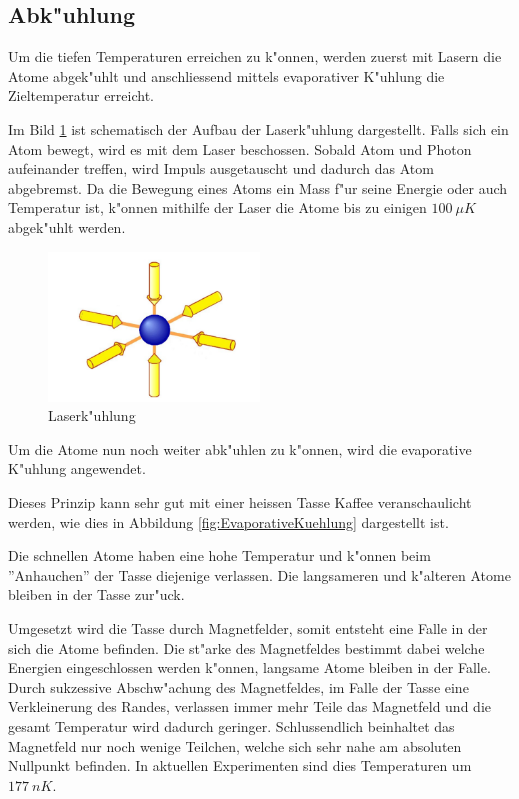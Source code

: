 \begin{refsection}
\subsection{Abk"uhlung}

Um die tiefen Temperaturen erreichen zu k"onnen, werden zuerst mit Lasern die Atome abgek"uhlt und anschliessend mittels evaporativer K"uhlung die Zieltemperatur erreicht. 

Im Bild \ref{fig:LaserKuehlung} ist schematisch der Aufbau der Laserk"uhlung dargestellt.
Falls sich ein Atom bewegt, wird es mit dem Laser beschossen. Sobald Atom und Photon aufeinander treffen, wird Impuls ausgetauscht und dadurch das Atom abgebremst.
Da die Bewegung eines Atoms ein Mass f"ur seine Energie oder auch Temperatur ist, k"onnen mithilfe der Laser die Atome bis zu einigen $100~\mu K$  abgek"uhlt werden. \cite{bose:LaserKuehlung}

\begin{figure}
	\centering
	\includegraphics[width = 0.5\textwidth]{./bose/laserkuehlung.png} 
	\caption[Laserk"uhlung]{Laserk"uhlung \cite{bose:WikiLaserKuehl}}
	\label{fig:LaserKuehlung}
\end{figure}

Um die Atome nun noch weiter abk"uhlen zu k"onnen, wird die evaporative K"uhlung angewendet.

Dieses Prinzip kann sehr gut mit einer heissen Tasse Kaffee veranschaulicht werden, wie dies in Abbildung \ref{fig:EvaporativeKuehlung} dargestellt ist.

Die schnellen Atome haben eine hohe Temperatur und k"onnen beim ''Anhauchen'' der Tasse diejenige verlassen. Die langsameren und k"alteren Atome bleiben in der Tasse zur"uck.

Umgesetzt wird die Tasse durch Magnetfelder, somit entsteht eine Falle in der sich die Atome befinden. Die st"arke des Magnetfeldes bestimmt dabei welche Energien eingeschlossen werden k"onnen, langsame Atome bleiben in der Falle. Durch sukzessive Abschw"achung des Magnetfeldes, im Falle der Tasse eine Verkleinerung des Randes, verlassen immer mehr Teile das Magnetfeld und die gesamt Temperatur wird dadurch geringer. Schlussendlich beinhaltet das Magnetfeld nur noch wenige Teilchen, welche sich sehr nahe am absoluten Nullpunkt befinden. In aktuellen Experimenten sind dies Temperaturen um $177~nK$. \cite{bose:WikiEvaporativeKuehlung}


\end{refsection}
